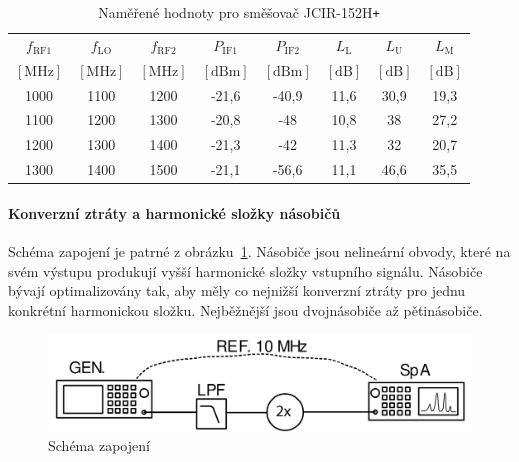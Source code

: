 \documentclass[11pt,a4paper]{article}
\newcommand{\plus}{{\texttt{+}}}
\begin{document}
\begin{table}[!ht]
    \centering
    \begin{tabular}{| c | c | c || c | c || c | c | c |}
        \hline
        $f_{\mathrm{RF1}}$ & $f_{\mathrm{LO}}$ & $f_{\mathrm{RF2}}$ & $P_{\mathrm{IF1}}$ & $P_{\mathrm{IF2}}$ & $L_{\mathrm{L}}$ & $L_{\mathrm{U}}$ & $L_{\mathrm{M}}$\\
        $[\mathrm{MHz}]$ & $[\mathrm{MHz}]$ & $[\mathrm{MHz}]$ & $[\mathrm{dBm}]$ & $[\mathrm{dBm}]$ & $[\mathrm{dB}]$ & $[\mathrm{dB}]$ & $[\mathrm{dB}]$\\
        \hline\hline
        1000 & 1100 & 1200 & -21,6 & -40,9 & 11,6 & 30,9 & 19,3\\
        \hline
        1100 & 1200 & 1300 & -20,8 & -48 & 10,8 & 38 & 27,2\\
        \hline
        1200 & 1300 & 1400 & -21,3 & -42 & 11,3 & 32 & 20,7\\
        \hline
        1300 & 1400 & 1500 & -21,1 & -56,6 & 11,1 & 46,6 & 35,5\\
        \hline
    \end{tabular}
    \caption{Naměřené hodnoty pro směšovač JCIR-152H\plus}
    \label{table:task3-data_JCIR-152H+}
\end{table}

\paragraph*{Konverzní ztráty a harmonické složky násobičů} Schéma zapojení je patrné z obrázku~\ref{fig:task4-zapojeni}. Násobiče jsou nelineární obvody, které na svém výstupu produkují vyšší harmonické složky vstupního signálu. Násobiče bývají optimalizovány tak, aby měly co nejnižší konverzní ztráty pro jednu konkrétní harmonickou složku. Nejběžnější jsou dvojnásobiče až pětinásobiče.
\begin{figure}[!ht]
    \centering
    \includegraphics[width=.65\textwidth]{src/task4-zapojeni.png}
    \caption{Schéma zapojení}
    \label{fig:task4-zapojeni}
\end{figure}
\end{document}
